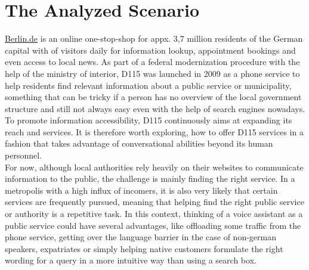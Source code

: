 \section{The Analyzed Scenario}
\href{https://www.berlin.de}{Berlin.de} is an online one-stop-shop for appx. 3,7 million residents of the German capital\cite{zensus} with  of visitors daily for information lookup, appointment bookings and even access to local news. As part of a federal modernization procedure with the help of the ministry of interior, D115 was launched in 2009 \cite{d115} as a phone service to help residents find relevant information about a public service or municipality, something that can be tricky if a person has no overview of the local government structure and still not always easy even with the help of search engines nowadays.
To promote information accessibility, D115 continuously aims at expanding its reach and services.
It is therefore worth exploring, how to offer D115 services in a fashion that takes advantage of conversational abilities beyond its human personnel. 
\\

For now, although local authorities rely heavily on their websites to communicate information to the public, the challenge is mainly finding the right service. %
In a metropolis with a high influx of incomers, it is also very likely that certain services are frequently pursued, meaning that helping find the right public service or authority is a repetitive task. In this context, thinking of a voice assistant as a public service could have several advantages, like offloading some traffic from the phone service, getting over the language barrier in the case of non-german speakers, expatriates or simply helping native customers formulate the right wording for a query in a more intuitive way than using a search box. 




